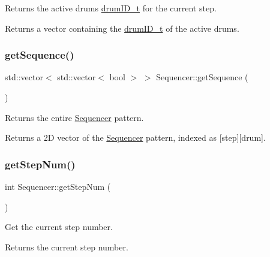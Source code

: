 Returns the active drums\textquotesingle{} \hyperlink{namespacedrumpi_a3897274035c1b939a604438abe648b1b}{drum\+I\+D\+\_\+t} for the current step. \begin{DoxyReturn}{Returns}
a vector containing the \hyperlink{namespacedrumpi_a3897274035c1b939a604438abe648b1b}{drum\+I\+D\+\_\+t} of the active drums. 
\end{DoxyReturn}
\mbox{\label{classdrumpi_1_1Sequencer_aa15ac653eaddea48cb4ccb8dadac9735}} 
\subsubsection{\texorpdfstring{get\+Sequence()}{getSequence()}}
{\footnotesize\ttfamily std\+::vector$<$ std\+::vector$<$ bool $>$ $>$ Sequencer\+::get\+Sequence (\begin{DoxyParamCaption}{ }\end{DoxyParamCaption})}

Returns the entire \hyperlink{classdrumpi_1_1Sequencer}{Sequencer} pattern. \begin{DoxyReturn}{Returns}
a 2D vector of the \hyperlink{classdrumpi_1_1Sequencer}{Sequencer} pattern, indexed as \mbox{[}step\mbox{]}\mbox{[}drum\mbox{]}. 
\end{DoxyReturn}
\mbox{\label{classdrumpi_1_1Sequencer_af327472b3452fa67511029daaee4ad1c}} 
\subsubsection{\texorpdfstring{get\+Step\+Num()}{getStepNum()}}
{\footnotesize\ttfamily int Sequencer\+::get\+Step\+Num (\begin{DoxyParamCaption}{ }\end{DoxyParamCaption})}

Get the current step number. \begin{DoxyReturn}{Returns}
the current step number. 
\end{DoxyReturn}
\mbox{\label{classdrumpi_1_1Sequencer_a5cc5ed8f6fd51b88618766a16373b60d}} 
